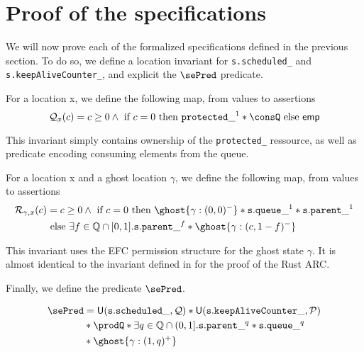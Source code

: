 \section{Proof of the specifications}
We will now prove each of the formalized specifications defined in the previous section. To do so, we define a location invariant for \texttt{s.scheduled\_} and \texttt{s.keepAliveCounter\_}, and explicit the $\sePred$ predicate.


\begin{definition}
For a location x, we define the following map, from values to assertions
\[
		\mathcal{Q}_{x}(c) = c \geq 0 \land \text{ if } c = 0 \text{ then }\mathtt{protected\_}^1 * \consQ \text{ else } \mathsf{emp}
\]
\end{definition}

This invariant simply contains ownership of the \texttt{protected\_} ressource, as well as predicate encoding consuming elements from the queue.

\begin{definition}
For a location x and a ghost location $\gamma$, we define the following map, from values to assertions
		\begin{align*}
				\mathcal{R}_{\gamma, x}(c) &= c \geq 0 \land \text{ if } c = 0 \text{ then } \ghost{\gamma : (0, 0)^-} * \mathtt{s.queue\_}^1 * \mathtt{s.parent\_}^1 \\ 
				&\text{ else } \exists f \in \mathbb{Q} \cap [0, 1]. \mathtt{s.parent\_}^f * \ghost{\gamma : (c, 1 - f)^-}
\end{align*}
\end{definition}

This invariant uses the EFC permission structure for the ghost state $\gamma$. It is almost identical to the invariant defined in \cite{gaurav} for the proof of the Rust ARC.

Finally, we define the predicate $\sePred$.

\begin{definition}
		\begin{align*}
				\sePred &= \mathsf{U}(\mathtt{s.scheduled\_}, \mathcal{Q}) * \mathsf{U}(\mathtt{s.keepAliveCounter\_}, \mathcal{P}) \\ 
				&* \prodQ * \exists q \in \mathbb{Q} \cap (0, 1]. \mathtt{s.parent\_}^q *\mathtt{s.queue\_}^q \\
				&* \ghost{\gamma : (1, q)^+}
		\end{align*}

\end{definition}

